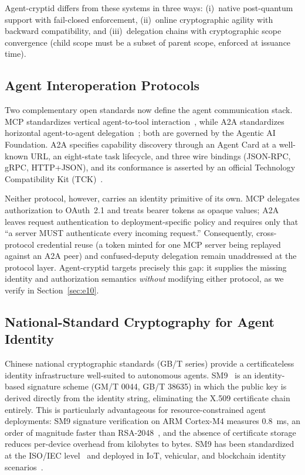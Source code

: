 \documentclass[10pt,twocolumn]{IEEEtran}
\begin{document}
Agent-cryptid differs from these systems in three ways: (i)~native
post-quantum support with fail-closed enforcement, (ii)~online cryptographic
agility with backward compatibility, and (iii)~delegation chains with
cryptographic scope convergence (child scope must be a subset of parent
scope, enforced at issuance time).

\subsection{Agent Interoperation Protocols}

Two complementary open standards now define the agent communication stack.
MCP standardizes vertical agent-to-tool interaction~\cite{ref:mcp-spec},
while A2A standardizes horizontal agent-to-agent delegation~\cite{ref:a2a-spec};
both are governed by the Agentic AI Foundation. A2A specifies capability
discovery through an Agent Card at a well-known URL, an eight-state task
lifecycle, and three wire bindings (JSON-RPC, gRPC, HTTP+JSON), and its
conformance is asserted by an official Technology Compatibility Kit
(TCK)~\cite{ref:a2a-tck}.

Neither protocol, however, carries an identity primitive of its own. MCP
delegates authorization to OAuth~2.1 and treats bearer tokens as opaque
values; A2A leaves request authentication to deployment-specific policy and
requires only that ``a server MUST authenticate every incoming request.''
Consequently, cross-protocol credential reuse (a token minted for one MCP
server being replayed against an A2A peer) and confused-deputy delegation
remain unaddressed at the protocol layer. Agent-cryptid targets precisely
this gap: it supplies the missing identity and authorization semantics
\emph{without} modifying either protocol, as we verify in
Section~\ref{sec:e10}.

\subsection{National-Standard Cryptography for Agent Identity}

Chinese national cryptographic standards (GB/T series) provide a
certificateless identity infrastructure well-suited to autonomous agents.
SM9~\cite{ref:sm9-std,ref:sm9-survey} is an identity-based signature scheme
(GM/T 0044, GB/T 38635) in which the public key is derived directly from
the identity string, eliminating the X.509 certificate chain entirely.
This is particularly advantageous for resource-constrained agent
deployments: SM9 signature verification on ARM Cortex-M4 measures 0.8~ms,
an order of magnitude faster than RSA-2048~\cite{ref:sm9-iot}, and the
absence of certificate storage reduces per-device overhead from
kilobytes to bytes. SM9 has been standardized at the ISO/IEC
level~\cite{ref:sm9-iso} and deployed in IoT, vehicular, and blockchain
identity scenarios~\cite{ref:sm9-survey}.
\end{document}
